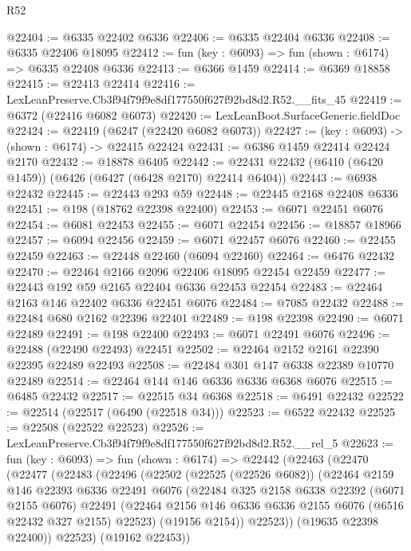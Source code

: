 \begin{lexlean}{R52}
\begin{coremodule}
@22404 := @6335 @22402 @6336
@22406 := @6335 @22404 @6336
@22408 := @6335 @22406 @18095
@22412 := fun (key : @6093) => fun (shown : @6174) => @6335 @22408 @6336
@22413 := @6366 @1459
@22414 := @6369 @18858
@22415 := @22413 @22414
@22416 := LexLeanPreserve.Cb3f94f79f9e8df177550f627f92bd8d2.R52.__fits_45
@22419 := @6372 (@22416 @6082 @6073)
@22420 := LexLeanBoot.SurfaceGeneric.fieldDoc
@22424 := @22419 (@6247 (@22420 @6082 @6073))
@22427 := (key : @6093) -> (shown : @6174) -> @22415 @22424
@22431 := @6386 @1459 @22414 @22424 @2170
@22432 := @18878 @6405
@22442 := @22431 @22432 (@6410 (@6420 @1459)) (@6426 (@6427 (@6428 @2170) @22414 @6404))
@22443 := @6938 @22432
@22445 := @22443 @293 @59
@22448 := @22445 @2168 @22408 @6336
@22451 := @198 (@18762 @22398 @22400)
@22453 := @6071 @22451 @6076
@22454 := @6081 @22453
@22455 := @6071 @22454
@22456 := @18857 @18966
@22457 := @6094 @22456
@22459 := @6071 @22457 @6076
@22460 := @22455 @22459
@22463 := @22448 @22460 (@6094 @22460)
@22464 := @6476 @22432
@22470 := @22464 @2166 @2096 @22406 @18095 @22454 @22459
@22477 := @22443 @192 @59 @2165 @22404 @6336 @22453 @22454
@22483 := @22464 @2163 @146 @22402 @6336 @22451 @6076
@22484 := @7085 @22432
@22488 := @22484 @680 @2162 @22396 @22401
@22489 := @198 @22398
@22490 := @6071 @22489
@22491 := @198 @22400
@22493 := @6071 @22491 @6076
@22496 := @22488 (@22490 @22493) @22451
@22502 := @22464 @2152 @2161 @22390 @22395 @22489 @22493
@22508 := @22484 @301 @147 @6338 @22389 @10770 @22489
@22514 := @22464 @144 @146 @6336 @6336 @6368 @6076
@22515 := @6485 @22432
@22517 := @22515 @34 @6368
@22518 := @6491 @22432
@22522 := @22514 (@22517 (@6490 (@22518 @34)))
@22523 := @6522 @22432
@22525 := @22508 (@22522 @22523)
@22526 := LexLeanPreserve.Cb3f94f79f9e8df177550f627f92bd8d2.R52.__rel_5
@22623 := fun (key : @6093) =>
  fun (shown : @6174) =>
  @22442
    (@22463
      (@22470
        (@22477
          (@22483
            (@22496
              (@22502
                (@22525 (@22526 @6082))
                (@22464
                  @2159
                  @146
                  @22393
                  @6336
                  @22491
                  @6076
                  (@22484
                    @325
                    @2158
                    @6338
                    @22392
                    (@6071 @2155 @6076)
                    @22491
                    (@22464 @2156 @146 @6336 @6336 @2155 @6076 (@6516 @22432 @327 @2155) @22523)
                    (@19156 @2154))
                  @22523))
              (@19635 @22398 @22400))
            @22523)
          (@19162 @22453))

\end{coremodule}
\end{lexlean}
